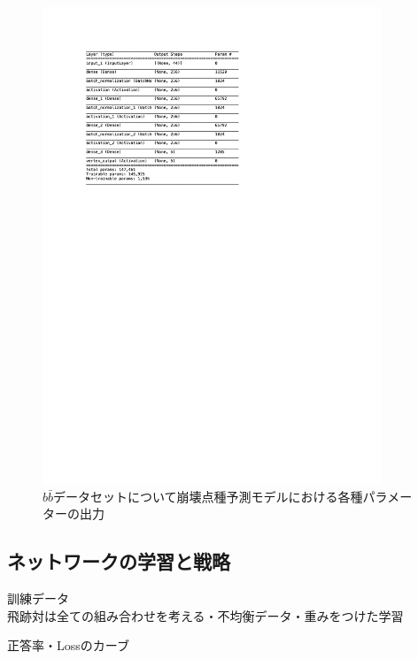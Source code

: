 \begin{figure}[h]
 \centering
 \includegraphics[trim = 75 500 125 0, width=0.9\textwidth]{Figure/3Networks/3-3-1-1PairModelSummary.png}
 \caption{$b\bar{b}$データセットについて崩壊点種予測モデルにおける各種パラメーターの出力}
 \label{3-3-1-1PairModelSummary}
\end{figure}


\subsection{ネットワークの学習と戦略} \label{Net:PM:TrainingandStrategyofPM}

訓練データ\\
飛跡対は全ての組み合わせを考える・不均衡データ・重みをつけた学習

正答率・Lossのカーブ\\

